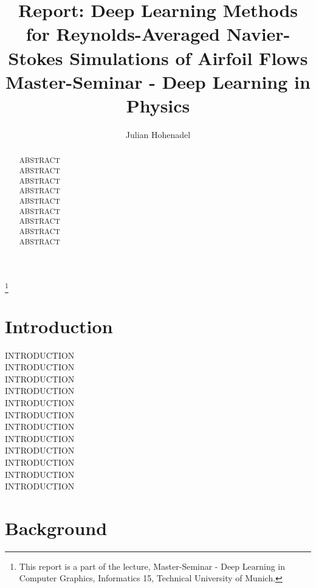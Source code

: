 \documentclass[acmtog]{techreportacmart}
\begin{document}
\title{Report: Deep Learning Methods for Reynolds-Averaged Navier-Stokes Simulations of
Airfoil Flows \\ Master-Seminar - Deep Learning in Physics} 
\author{Julian Hohenadel}

\renewcommand\shortauthors{Hohenadel}

\begin{abstract}
ABSTRACT \\
ABSTRACT \\
ABSTRACT \\
ABSTRACT \\
ABSTRACT \\
ABSTRACT \\
ABSTRACT \\
ABSTRACT \\
ABSTRACT \\
\end{abstract}

%
%



\thanks{This report is a part of the lecture, Master-Seminar - Deep Learning in
  Computer Graphics, Informatics 15, Technical University of Munich.}


\maketitle

\section{Introduction}

INTRODUCTION \\
INTRODUCTION \\
INTRODUCTION \\
INTRODUCTION \\
INTRODUCTION \\
INTRODUCTION \\
INTRODUCTION \\
INTRODUCTION \\
INTRODUCTION \\
INTRODUCTION \\
INTRODUCTION \\
INTRODUCTION \\

\section{Background}
\end{document}
